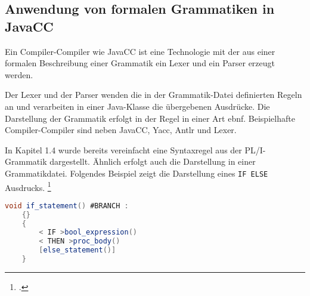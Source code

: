 


     
\pagebreak
\subsection{Anwendung von formalen Grammatiken in JavaCC}

Ein Compiler-Compiler wie JavaCC ist eine Technologie mit der aus einer formalen Beschreibung einer Grammatik ein Lexer und ein Parser erzeugt werden. 

Der Lexer und der Parser wenden die in der Grammatik-Datei definierten Regeln an und verarbeiten in einer Java-Klasse die übergebenen Ausdrücke.
Die Darstellung der Grammatik erfolgt in der Regel in einer Art \ac{ebnf}. 
Beispielhafte Compiler-Compiler sind neben JavaCC, Yacc, Antlr und Lexer.


In Kapitel 1.4 wurde bereits vereinfacht eine Syntaxregel aus der PL/I-Grammatik dargestellt. Ähnlich erfolgt auch die Darstellung in einer Grammatikdatei. Folgendes Beispiel zeigt die Darstellung eines \verb+IF ELSE+ Ausdrucks. 
\footcite[Vgl. ][]{javaccdoku}


\begin{lstlisting}[language=Java, caption=If Statement aus der Grammatikdatei, label={lst:ifstatement}]
	void if_statement() #BRANCH :
	{}
	{
		< IF >bool_expression()
		< THEN >proc_body()
		[else_statement()]
	}
\end{lstlisting}

